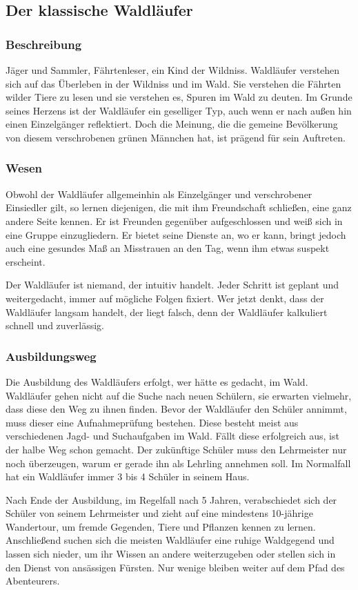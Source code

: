 \subsection{Der klassische Waldläufer}
\subsubsection{Beschreibung}
\par Jäger und Sammler, Fährtenleser, ein Kind der Wildniss. Waldläufer verstehen sich auf das Überleben 
in der Wildniss und im Wald. Sie verstehen die Fährten wilder Tiere zu lesen und sie verstehen es, Spuren im 
Wald zu deuten.
Im Grunde seines Herzens ist der Waldläufer ein geselliger Typ, auch wenn er nach außen hin einen Einzelgänger 
reflektiert. Doch die Meinung, die die gemeine Bevölkerung von diesem verschrobenen grünen Männchen hat, ist 
prägend für sein Auftreten.
\subsubsection{Wesen}
\par Obwohl der Waldläufer allgemeinhin als Einzelgänger und verschrobener Einsiedler gilt, so lernen diejenigen, 
die mit ihm Freundschaft schließen, eine ganz andere Seite kennen. Er ist Freunden gegenüber aufgeschlossen und 
weiß sich in eine Gruppe einzugliedern. Er bietet seine Dienste an, wo er kann, bringt jedoch auch eine gesundes 
Maß an Misstrauen an den Tag, wenn ihm etwas suspekt erscheint.
\par Der Waldläufer ist niemand, der intuitiv handelt. Jeder Schritt ist geplant und weitergedacht, immer auf 
mögliche Folgen fixiert. Wer jetzt denkt, dass der Waldläufer langsam handelt, der liegt falsch, denn der Waldläufer 
kalkuliert schnell und zuverlässig.
\subsubsection{Ausbildungsweg}
\par Die Ausbildung des Waldläufers erfolgt, wer hätte es gedacht, im Wald. Waldläufer gehen nicht auf die 
Suche nach neuen Schülern, sie erwarten vielmehr, dass diese den Weg zu ihnen finden. Bevor der Waldläufer den 
Schüler annimmt, muss dieser eine Aufnahmeprüfung bestehen. Diese besteht meist aus verschiedenen Jagd- und 
Suchaufgaben im Wald. Fällt diese erfolgreich aus, ist der halbe Weg schon gemacht. Der zukünftige Schüler 
muss den Lehrmeister nur noch überzeugen, warum er gerade ihn als Lehrling annehmen soll. Im Normalfall hat ein 
Waldläufer immer 3 bis 4 Schüler in seinem Haus.
\par Nach Ende der Ausbildung, im Regelfall nach 5 Jahren, verabschiedet sich der Schüler von seinem Lehrmeister 
und zieht auf eine mindestens 10-jährige Wandertour, um fremde Gegenden, Tiere und Pflanzen kennen zu lernen. 
Anschließend suchen sich die meisten Waldläufer eine ruhige Waldgegend und lassen sich nieder, um ihr Wissen 
an andere weiterzugeben oder stellen sich in den Dienst von ansässigen Fürsten. Nur wenige bleiben weiter auf 
dem Pfad des Abenteurers.
